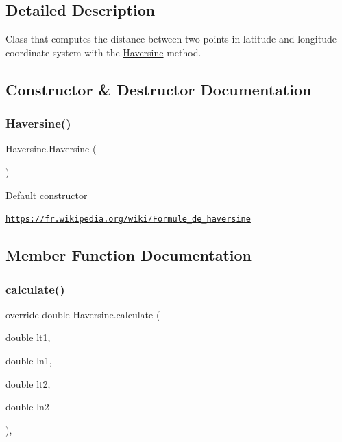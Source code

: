 \subsection{Detailed Description}
Class that computes the distance between two points in latitude and longitude coordinate system with the \hyperlink{classHaversine}{Haversine} method. 



\subsection{Constructor \& Destructor Documentation}
\mbox{\label{classHaversine_af81a4fdf44f4e11a353a30efe42fcb5e}} 
\subsubsection{\texorpdfstring{Haversine()}{Haversine()}}
{\footnotesize\ttfamily Haversine.\+Haversine (\begin{DoxyParamCaption}{ }\end{DoxyParamCaption})\hspace{0.3cm}{\ttfamily [inline]}}



Default constructor 

\href{https://fr.wikipedia.org/wiki/Formule_de_haversine}{\tt https\+://fr.\+wikipedia.\+org/wiki/\+Formule\+\_\+de\+\_\+haversine}

\subsection{Member Function Documentation}
\mbox{\label{classHaversine_a63973b82d76e151b9f55b0dbdb005e47}} 
\subsubsection{\texorpdfstring{calculate()}{calculate()}\hspace{0.1cm}{\footnotesize\ttfamily [1/2]}}
{\footnotesize\ttfamily override double Haversine.\+calculate (\begin{DoxyParamCaption}\item[{double}]{lt1,  }\item[{double}]{ln1,  }\item[{double}]{lt2,  }\item[{double}]{ln2 }\end{DoxyParamCaption})\hspace{0.3cm}{\ttfamily [inline]}, {\ttfamily [virtual]}}



